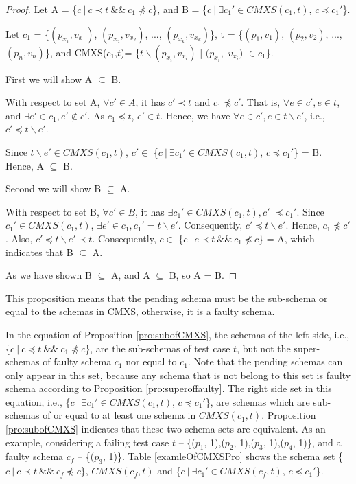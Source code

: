 \begin{proof}

Let A =  \{$c\ |\ c \prec t\ \&\&\ c_{1} \npreceq c$\}, and B = \{$ c\ |\ \exists c_{1}' \in CMXS(c_{1}, t)$, $c \preceq c_{1}'$\}.



Let $c_{1}$ = \{$(p_{x_{1}}, v_{x_{1}})$, $(p_{x_{2}}, v_{x_{2}})$, ..., $(p_{x_{k}}, v_{x_{k}})$\},  t = \{$(p_{1}, v_{1})$, $(p_{2}, v_{2})$, ..., $(p_{n}, v_{n})$\}, and CMXS($c_{1}$,$t$)= \{$t \backslash (p_{x_{i}}, v_{x_{i}})$ | $(p_{x_{i}},$ $v_{x_{i}})$ $ \in c_{1} $\}.

First we will show A $\subseteq$ B.

With respect to set A, $\forall c' \in A$, it has $c' \prec t$ and $ c_{1} \npreceq c'$. That is, $\forall e \in c', e \in t$, and  $\exists e' \in c_{1}, e' \not\in c'$. As $c_{1} \preceq t$, $e' \in t$. Hence, we have $\forall e \in c', e \in t \backslash e'$, i.e., $c' \preceq t \backslash e'$.

Since $t \backslash e' \in CMXS(c_{1}, t)$,  $c' \in $ \{$ c\ |\ \exists c_{1}' \in CMXS(c_{1}, t)$, $c \preceq c_{1}'$\} = B. Hence, A $\subseteq$ B.

Second we will show B $\subseteq$ A.

With respect to set B, $\forall c' \in B$, it has $\exists c_{1}' \in CMXS(c_{1}, t), c'$ $ \preceq c_{1}'$. Since $c_{1}' \in CMXS(c_{1}, t)$, $\exists e' \in c_{1}, c_{1}' =  t \backslash e'$. Consequently, $c' \preceq t \backslash e'$. Hence, $c_{1} \npreceq c'$. Also, $c' \preceq t \backslash e' \prec t$. Consequently, $c \in $  \{$c\ |\ c \prec t\ \&\&\ c_{1} \npreceq c$\} = A, which indicates that B $\subseteq$ A.

As we have shown B $\subseteq$ A, and A $\subseteq$ B, so A = B.

\end{proof}

This proposition means that the pending schema must be the sub-schema or equal to the schemas in CMXS, otherwise, it is a faulty schema.

In the equation of Proposition \ref{pro:subofCMXS}, the schemas of the left side, i.e., \{$c\ |\ c \preceq t\ \&\&\ c_{1} \npreceq c$\}, are the sub-schemas of test case $t$, but not the super-schemas of faulty schema $c_{1}$ nor equal to $c_{1}$.  Note that the pending schemas can only appear in this set, because any schema that is not belong to this set is faulty schema according to Proposition \ref{pro:superoffaulty}. The right side set in this equation, i.e., \{$ c\ |\ \exists c_{1}' \in CMXS(c_{1}, t)$, $c \preceq c_{1}'$\}, are schemas which are sub-schemas of or equal to at least one schema in $CMXS(c_{1}, t)$. Proposition \ref{pro:subofCMXS} indicates that these two schema sets are equivalent. As an example, considering a failing test case $t$ -- \{($p_{1}$, 1),($p_{2}$, 1),($p_{3}$, 1),($p_{4}$, 1)\}, and a faulty schema $c_{f}$ --  \{($p_{3}$, 1)\}. Table \ref{examleOfCMXSPro} shows the schema set  \{$c\ |\ c \prec t\ \&\&\ c_{f} \npreceq c$\}, $CMXS(c_{f}, t)$ and \{$ c\ |\ \exists c_{1}' \in CMXS(c_{f}, t)$, $c \preceq c_{1}'$\}.


